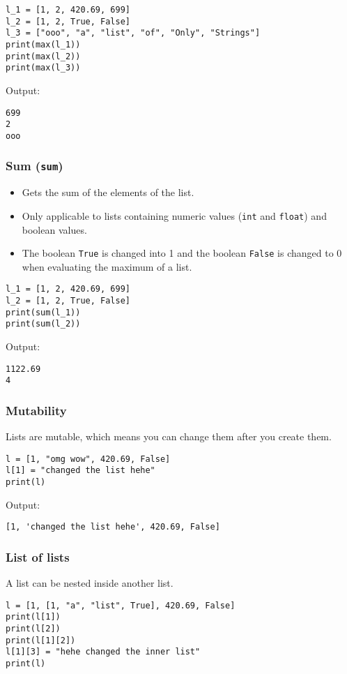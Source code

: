 \documentclass[11pt]{article}
\begin{document}
\begin{verbatim}
l_1 = [1, 2, 420.69, 699]
l_2 = [1, 2, True, False]
l_3 = ["ooo", "a", "list", "of", "Only", "Strings"]
print(max(l_1))
print(max(l_2))
print(max(l_3))
\end{verbatim}

 \noindent Output:

\begin{verbatim}
699
2
ooo
\end{verbatim}

\subsubsection{Sum (\texttt{sum})}
\label{sec:org1213c9c}
\begin{itemize}
\item Gets the sum of the elements of the list.
\item Only applicable to lists containing numeric values (\texttt{int} and \texttt{float}) and boolean values.
\item The boolean \texttt{True} is changed into 1 and the boolean \texttt{False} is changed to 0 when evaluating the maximum of a list.
\end{itemize}

\begin{verbatim}
l_1 = [1, 2, 420.69, 699]
l_2 = [1, 2, True, False]
print(sum(l_1))
print(sum(l_2))
\end{verbatim}

 \noindent Output:

\begin{verbatim}
1122.69
4
\end{verbatim}

\subsubsection{Mutability}
\label{sec:orgdab2ba2}
Lists are mutable, which means you can change them after you create them.
\begin{verbatim}
l = [1, "omg wow", 420.69, False]
l[1] = "changed the list hehe"
print(l)
\end{verbatim}

 \noindent Output:

\begin{verbatim}
[1, 'changed the list hehe', 420.69, False]
\end{verbatim}

\subsubsection{List of lists}
\label{sec:org95aeeee}
A list can be nested inside another list.
\begin{verbatim}
l = [1, [1, "a", "list", True], 420.69, False]
print(l[1])
print(l[2])
print(l[1][2])
l[1][3] = "hehe changed the inner list"
print(l)
\end{verbatim}
\end{document}
